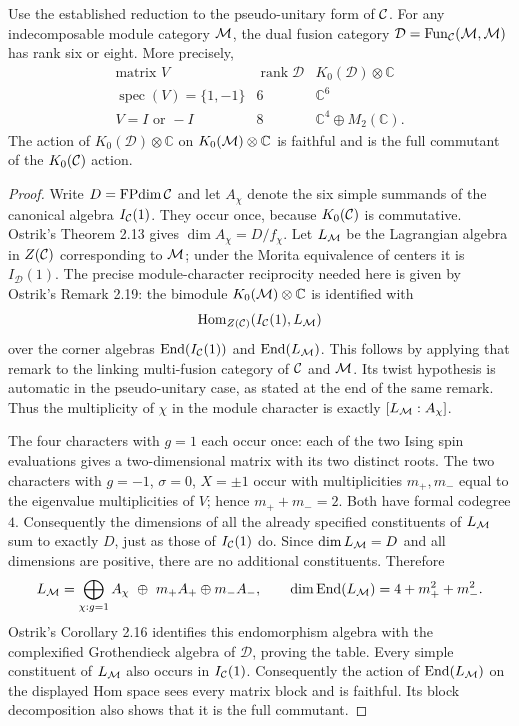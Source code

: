 \begin{theorem}
Use the established reduction to the pseudo-unitary form of $\mathcal C$.
For any indecomposable module category $\mathcal M$, the dual fusion category
$\mathcal D=\operatorname{Fun}_{\mathcal C}(\mathcal M,\mathcal M)$ has rank six or eight.
More precisely,
\[
\begin{array}{c|c|c}
\text{matrix }V&\operatorname{rank}\mathcal D&
K_0(\mathcal D)\otimes\mathbb C\\\hline
\operatorname{spec}(V)=\{1,-1\}&6&\mathbb C^6\\
V=I\text{ or }-I&8&\mathbb C^4\oplus M_2(\mathbb C).
\end{array}
\]
The action of $K_0(\mathcal D)\otimes\mathbb C$ on
$K_0(\mathcal M)\otimes\mathbb C$ is faithful and is the full commutant of
the $K_0(\mathcal C)$ action.
\end{theorem}
\begin{proof}
Write $D=\operatorname{FPdim}\mathcal C$ and let $A_\chi$ denote the six simple summands
of the canonical algebra $I_{\mathcal C}(1)$. They occur once, because
$K_0(\mathcal C)$ is commutative. Ostrik's Theorem 2.13 gives
$\dim A_\chi=D/f_\chi$.
Let $L_\mathcal M$ be the Lagrangian algebra in $Z(\mathcal C)$ corresponding to
$\mathcal M$; under the Morita equivalence of centers it is $I_{\mathcal D}(1)$.
The precise module-character reciprocity needed here is given by
Ostrik's Remark 2.19: the bimodule $K_0(\mathcal M)\otimes\mathbb C$ is
identified with
\[
\operatorname{Hom}_{Z(\mathcal C)}(I_{\mathcal C}(1),L_\mathcal M)
\]
over the corner algebras $\operatorname{End}(I_{\mathcal C}(1))$ and
$\operatorname{End}(L_\mathcal M)$. This follows by applying that remark to
the linking multi-fusion category of $\mathcal C$ and $\mathcal M$.
Its twist hypothesis is automatic in the pseudo-unitary case, as stated
at the end of the same remark. Thus the multiplicity of $\chi$ in the
module character is exactly $[L_\mathcal M:A_\chi]$.

The four characters with $g=1$ each occur once: each of the two Ising
spin evaluations gives a two-dimensional matrix with its two distinct
roots. The two characters with $g=-1$, $\sigma=0$, $X=\pm1$ occur
with multiplicities $m_+,m_-$ equal to the eigenvalue multiplicities of
$V$; hence $m_++m_-=2$. Both have formal codegree $4$. Consequently
the dimensions of all the already specified constituents of $L_\mathcal M$ sum
to exactly $D$, just as those of $I_{\mathcal C}(1)$ do. Since
$\dim L_\mathcal M=D$ and all dimensions are positive, there are no additional
constituents. Therefore
\[
L_\M=\bigoplus_{\chi:g=1}A_\chi\ \oplus\ m_+A_+\oplus m_-A_-,
\qquad
\dim\operatorname{End}(L_\M)=4+m_+^2+m_-^2.
\]
Ostrik's Corollary 2.16 identifies this endomorphism algebra with the
complexified Grothendieck algebra of $\mathcal D$, proving the table.
Every simple constituent of $L_\mathcal M$ also occurs in $I_{\mathcal C}(1)$.
Consequently the action of $\operatorname{End}(L_\mathcal M)$ on the displayed
Hom space sees every matrix block and is faithful. Its block
decomposition also shows that it is the full commutant.
\end{proof}

